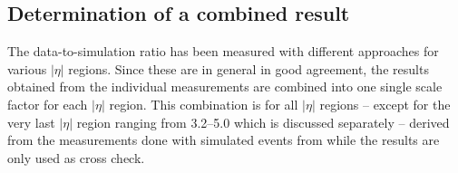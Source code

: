 \subsection{Determination of a combined result}
\label{subsec:jer_combination}
\begin{table}[!t]
\centering
\caption{Measured data-to-simulation ratio in various $|\eta|$ regions with statistical and systematic uncertainty as well as the total uncertainty.}
\label{tab:result}
\end{table} 
The data-to-simulation ratio has been measured with different approaches for various $|\eta|$ regions. Since these are in general in good agreement, the results obtained from the individual measurements are combined into one single scale factor for each $|\eta|$ region. This combination is for all $|\eta|$ regions -- except for the very last $|\eta|$ region ranging from 3.2--5.0 which is discussed separately -- derived from the measurements done with simulated events from \pythia while the \herwig results are only used as cross check. \\
